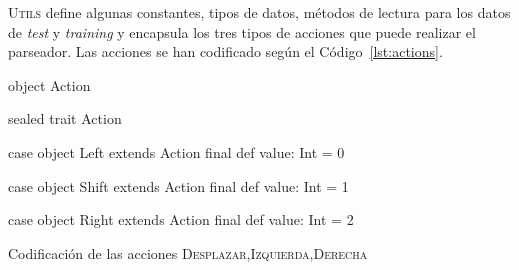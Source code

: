 \textsc{Utils} define algunas constantes, tipos de datos, métodos de lectura
para los datos de \emph{test} y \emph{training} y encapsula los tres tipos de
acciones que puede realizar el parseador. Las acciones se han codificado según
el Código~\ref{lst:actions}.
\begin{listing}[ht]
  \begin{scalacode}
    object Action {

      sealed trait Action

      case object Left extends Action {
        final def value: Int = 0
      }

      case object Shift extends Action {
        final def value: Int = 1
      }

      case object Right extends Action {
        final def value: Int = 2
      }
    }
  \end{scalacode}
  \caption{\footnotesize Codificación de las acciones \textsc{Desplazar,Izquierda,Derecha}}
  \label{lst:actions}
\end{listing}


